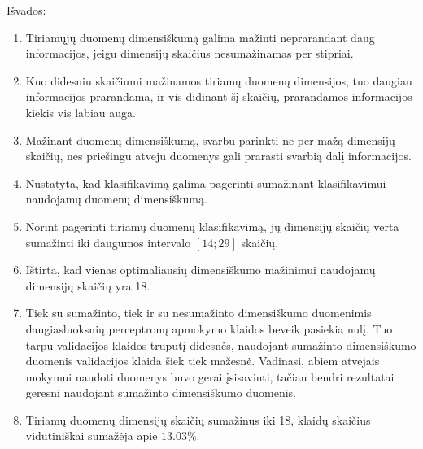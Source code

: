 \documentclass{VUMIFPSbakalaurinis}
\begin{document}
Išvados:
\begin{enumerate}
	\item Tiriamųjų duomenų dimensiškumą galima mažinti neprarandant daug informacijos, jeigu dimensijų skaičius nesumažinamas per stipriai.
	\item Kuo didesniu skaičiumi mažinamos tiriamų duomenų dimensijos, tuo daugiau informacijos prarandama, ir vis didinant šį skaičių, prarandamos informacijos kiekis vis labiau auga.
	\item Mažinant duomenų dimensiškumą, svarbu parinkti ne per mažą dimensijų skaičių, nes priešingu atveju duomenys gali prarasti svarbią dalį informacijos.
	\item Nustatyta, kad klasifikavimą galima pagerinti sumažinant klasifikavimui naudojamų duomenų dimensiškumą.
	\item Norint pagerinti tiriamų duomenų klasifikavimą, jų dimensijų skaičių verta sumažinti iki daugumos intervalo $[14; 29]$ skaičių.
	\item Ištirta, kad vienas optimaliausių dimensiškumo mažinimui naudojamų dimensijų skaičių yra 18.

	\item Tiek su sumažinto, tiek ir su nesumažinto dimensiškumo duomenimis daugiasluoksnių perceptronų apmokymo klaidos beveik pasiekia nulį. Tuo tarpu validacijos klaidos truputį didesnės, naudojant sumažinto dimensiškumo duomenis validacijos klaida šiek tiek mažesnė. Vadinasi, abiem atvejais mokymui naudoti duomenys buvo gerai įsisavinti, tačiau bendri rezultatai geresni naudojant sumažinto dimensiškumo duomenis.
	\item Tiriamų duomenų dimensijų skaičių sumažinus iki 18, klaidų skaičius vidutiniškai sumažėja apie $13.03\%$.
\end{enumerate}



\clearpage
\printbibliography[heading=bibintoc]  %

\end{document}
